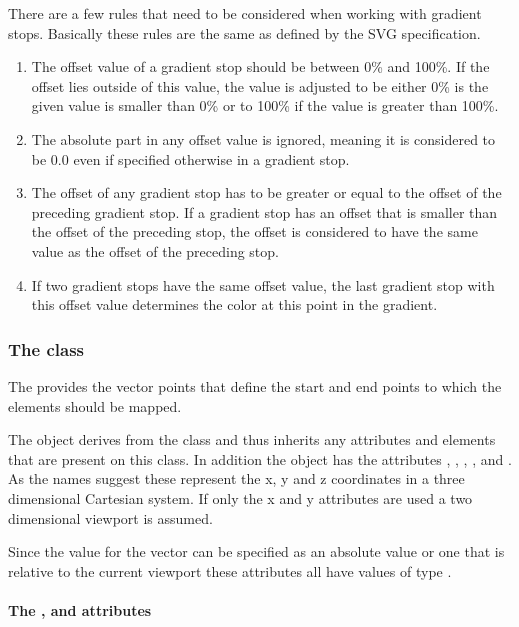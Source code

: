 There are a few rules that need to be considered when working with gradient stops.
Basically these rules are the same as defined by the SVG specification.

\begin{enumerate}
\item{The offset value of a gradient stop should be between 0\% and 100\%. If the offset lies outside of this value, the value is adjusted to be either 0\% is the given value is smaller than 0\% or to 100\% if the value is greater than 100\%.}
\item{The absolute part in any offset value is ignored, meaning it is considered to be 0.0 even if specified otherwise in a gradient stop.}
\item{The offset of any gradient stop has to be greater or equal to the offset of the preceding gradient stop. If a gradient stop has an offset that is smaller than the offset of the preceding stop, the offset is considered to have the same value as the offset of the preceding stop.}
\item{If two gradient stops have the same offset value, the last gradient stop with this offset value determines the color at this point in the gradient.}
\end{enumerate}
\subsubsection{The  class}
\label{lineargradient-class}

The \LinearGradient provides the vector points that define the start and end points to which the \GradientStop elements should be mapped.

The \LinearGradient object derives from the \GradientBase class and thus
inherits any attributes and elements that are present on this class.
In addition the \LinearGradient object has the attributes  , ,
, ,  and . As the names suggest these represent the x, y and z coordinates in a three dimensional Cartesian system. If only the x and y attributes are used a two dimensional viewport is assumed.

Since the value for the vector can be specified as an absolute value or one that is relative to the current viewport these attributes all have values of type \RelAbsVector.

\paragraph{The \fixttspace{}, \fixttspace{} and \fixttspace{} attributes}

